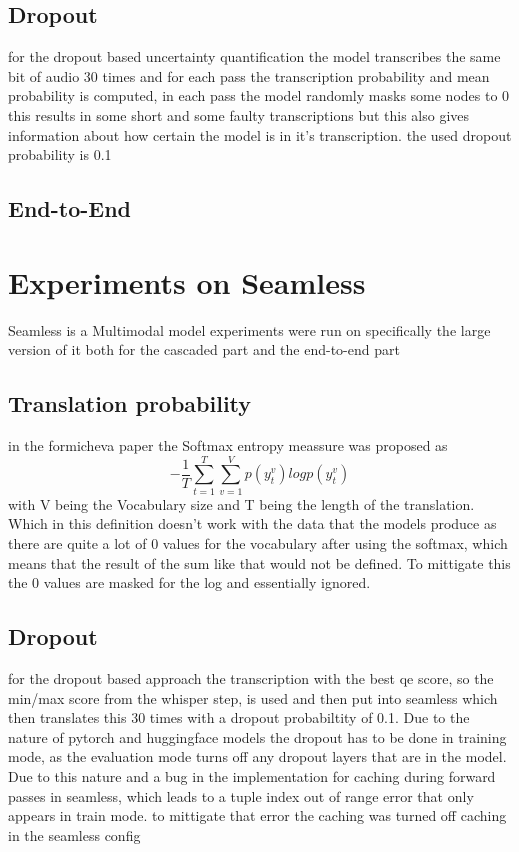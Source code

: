\section{Dropout}
for the dropout based uncertainty quantification the model transcribes the same bit of audio 30 times and for each pass the transcription probability and mean probability is computed, in each pass the model randomly masks some nodes to 0
this results in some short and some faulty transcriptions but this also gives information about how certain the model is in it's transcription. the used dropout probability is 0.1 


\section{End-to-End}


\chapter{Experiments on Seamless}
Seamless is a Multimodal model 
experiments were run on \cite{seamless2023} specifically the large version of it both for the cascaded part and the end-to-end part


\section{Translation probability}
in the formicheva \cite{fomicheva2020unsupervised} paper the Softmax entropy meassure was proposed as $$-\frac{1}{T}\sum_{t=1}^T\sum_{v=1}^Vp(y_t^v)logp(y_t^v) \label{formula:translation probability}$$ with V being the Vocabulary size and T being the length of the translation. Which in this definition doesn't work with the data that the models produce as there are quite a lot of 0 values for the vocabulary after using the softmax, which means that the result of the sum like that would not be defined. To mittigate this the 0 values are masked for the log and essentially ignored. 


\section{Dropout}
for the dropout based approach the transcription with the best qe score, so the min/max score from the whisper step, is used 
and then put into seamless which then translates this 30 times with a dropout probabiltity of 0.1.
Due to the nature of pytorch and huggingface models the dropout has to be done in training mode, as the evaluation mode turns off any dropout layers that are in the model. Due to this nature and a bug in the implementation for caching during forward passes in seamless, which leads to a tuple index out of range error that only appears in train mode. to mittigate that error the caching was turned off caching in the seamless config


